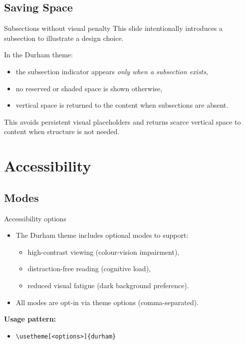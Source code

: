 \documentclass[aspectratio=169]{beamer}
\begin{document}
\subsection{Saving Space}

\begin{frame}{Subsections without visual penalty}
This slide intentionally introduces a subsection to illustrate a design choice.

\medskip
In the Durham theme:
\begin{itemize}
  \item the subsection indicator appears \emph{only when a subsection exists},
  \item no reserved or shaded space is shown otherwise,
  \item vertical space is returned to the content when subsections are absent.
\end{itemize}

\medskip
This avoids persistent visual placeholders and returns scarce vertical space to content when structure is not needed.
\end{frame}


\section{Accessibility}
\subsection{Modes}
\begin{frame}{Accessibility options}
\begin{itemize}
  \item The Durham theme includes optional modes to support:
  \begin{itemize}
    \item high-contrast viewing (colour-vision impairment),
    \item distraction-free reading (cognitive load),
    \item reduced visual fatigue (dark background preference).
  \end{itemize}
  \item All modes are opt-in via theme options (comma-separated).
\end{itemize}

\vspace{0.6em}
\textbf{Usage pattern:}
\begin{itemize}
  \item \texttt{\textbackslash usetheme[<options>]\{durham\}}
\end{itemize}
\end{frame}
\end{document}
